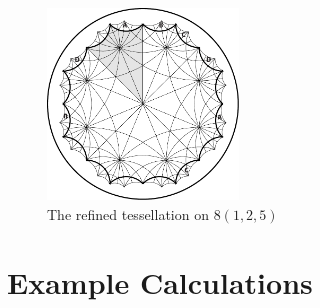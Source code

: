 \documentclass[12pt,reqno]{amsart}
\DeclareMathOperator{\Aut}{Aut}
\newcommand{\Z}{\mathbb{Z}}
\newcommand{\R}{\mathbb{R}}
\theoremstyle{definition}
\theoremstyle{remark}
\newcommand{\ti}{\todo[inline]}
\begin{document}







\begin{figure}[htbp] %
   \centering
   \includegraphics[width=2in]{figures/125_hyp} 
	\caption{The refined tessellation on $8(1, 2, 5)$}
	\label{fig:125_ref}
\end{figure}




\section{Example Calculations}
\label{sec:examples}
\end{document}
